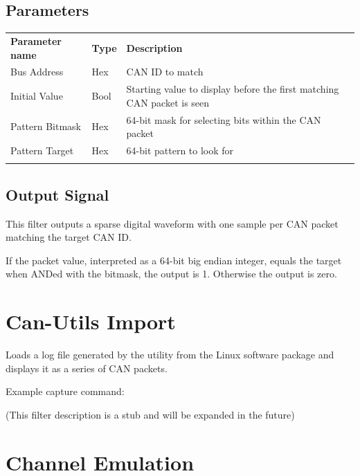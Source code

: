 \subsection{Parameters}

\begin{tabularx}{16cm}{llX}
\thickhline
\textbf{Parameter name} & \textbf{Type} & \textbf{Description} \\
\thickhline
Bus Address & Hex & CAN ID to match\\
\thinhline
Initial Value & Bool & Starting value to display before the first matching CAN packet is seen\\
\thinhline
Pattern Bitmask & Hex & 64-bit mask for selecting bits within the CAN packet\\
\thinhline
Pattern Target & Hex & 64-bit pattern to look for\\
\thickhline
\end{tabularx}

\subsection{Output Signal}

This filter outputs a sparse digital waveform with one sample per CAN packet matching the target CAN ID.

If the packet value, interpreted as a 64-bit big endian integer, equals the target when ANDed with the bitmask, the
output is 1. Otherwise the output is zero.

\pagebreak
\section{Can-Utils Import}

Loads a log file generated by the  utility from the Linux  software package and
displays it as a series of CAN packets.

Example capture command: 

(This filter description is a stub and will be expanded in the future)

\pagebreak
\section{Channel Emulation}
\label{filter:channelemu}

